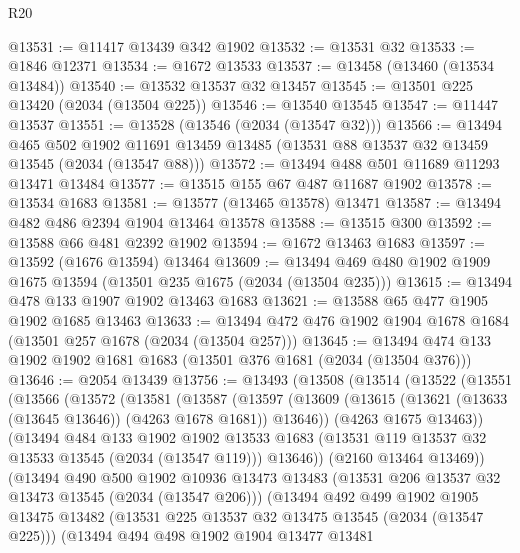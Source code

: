 \begin{lexlean}{R20}
\begin{coremodule}
@13531 := @11417 @13439 @342 @1902
@13532 := @13531 @32
@13533 := @1846 @12371
@13534 := @1672 @13533
@13537 := @13458 (@13460 (@13534 @13484))
@13540 := @13532 @13537 @32 @13457
@13545 := @13501 @225 @13420 (@2034 (@13504 @225))
@13546 := @13540 @13545
@13547 := @11447 @13537
@13551 := @13528 (@13546 (@2034 (@13547 @32)))
@13566 := @13494
    @465
    @502
    @1902
    @11691
    @13459
    @13485
    (@13531 @88 @13537 @32 @13459 @13545 (@2034 (@13547 @88)))
@13572 := @13494 @488 @501 @11689 @11293 @13471 @13484
@13577 := @13515 @155 @67 @487 @11687 @1902
@13578 := @13534 @1683
@13581 := @13577 (@13465 @13578) @13471
@13587 := @13494 @482 @486 @2394 @1904 @13464 @13578
@13588 := @13515 @300
@13592 := @13588 @66 @481 @2392 @1902
@13594 := @1672 @13463 @1683
@13597 := @13592 (@1676 @13594) @13464
@13609 := @13494 @469 @480 @1902 @1909 @1675 @13594 (@13501 @235 @1675 (@2034 (@13504 @235)))
@13615 := @13494 @478 @133 @1907 @1902 @13463 @1683
@13621 := @13588 @65 @477 @1905 @1902 @1685 @13463
@13633 := @13494 @472 @476 @1902 @1904 @1678 @1684 (@13501 @257 @1678 (@2034 (@13504 @257)))
@13645 := @13494 @474 @133 @1902 @1902 @1681 @1683 (@13501 @376 @1681 (@2034 (@13504 @376)))
@13646 := @2054 @13439
@13756 := @13493
    (@13508
      (@13514
        (@13522
          (@13551
            (@13566
              (@13572
                (@13581
                  (@13587
                    (@13597
                      (@13609 (@13615 (@13621 (@13633 (@13645 @13646)) (@4263 @1678 @1681)) @13646))
                      (@4263 @1675 @13463))
                    (@13494
                      @484
                      @133
                      @1902
                      @1902
                      @13533
                      @1683
                      (@13531 @119 @13537 @32 @13533 @13545 (@2034 (@13547 @119)))
                      @13646))
                  (@2160 @13464 @13469))
                (@13494
                  @490
                  @500
                  @1902
                  @10936
                  @13473
                  @13483
                  (@13531 @206 @13537 @32 @13473 @13545 (@2034 (@13547 @206)))
                  (@13494
                    @492
                    @499
                    @1902
                    @1905
                    @13475
                    @13482
                    (@13531 @225 @13537 @32 @13475 @13545 (@2034 (@13547 @225)))
                    (@13494
                      @494
                      @498
                      @1902
                      @1904
                      @13477
                      @13481

\end{coremodule}
\end{lexlean}
